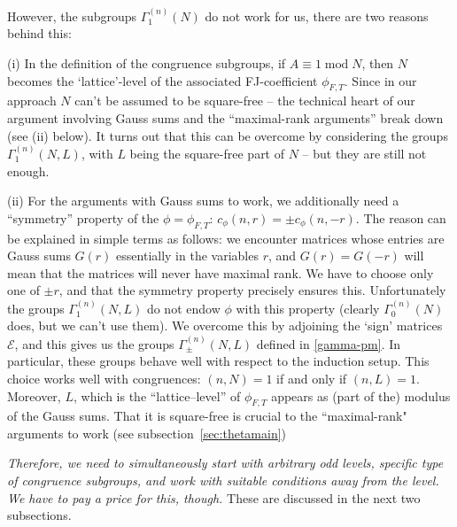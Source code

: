 \documentclass[11pt]{amsart}
\numberwithin{equation}{section}
\newcommand{\mc}{\mathcal}
\renewcommand*{\mod}{\operatorname{mod}}
\begin{document}
However, the subgroups $\Gamma_1^{(n)}(N)$ do not work for us, there are two reasons behind this:

(i) In the definition of the congruence subgroups, if $A \equiv 1 \mod N$, then $N$ becomes the `lattice'-level of  the associated FJ-coefficient $\phi_{F,T}$. Since in our approach $N$ can't be assumed to be square-free -- the technical heart of our argument involving Gauss sums  and the ``maximal-rank arguments'' break down (see (ii) below). It turns out that this can be overcome by considering the groups $\Gamma_1^{(n)}(N,L)$, with $L$ being the square-free part of $N$ -- but they are still not enough.

(ii) For the arguments with Gauss sums to work, we additionally need a ``symmetry'' property of the $\phi=\phi_{F,T}$: $c_\phi(n,r)= \pm c_\phi(n,-r)$.
The reason can be explained in simple terms as follows: we encounter matrices whose entries are Gauss sums $G(r)$ essentially in the variables $r$, and $G(r)=G(-r)$ will mean that the matrices will never have maximal rank. We have to choose only one of $\pm r$, and that the symmetry property precisely ensures this. Unfortunately the groups $\Gamma_1^{(n)}(N,L)$ do not endow $\phi$ with this property (clearly $\Gamma_0^{(n)}(N)$ does, but we can't use them). We overcome this by adjoining the `sign' matrices $\mc E$, and
this gives us the groups $\Gamma_\pm^{(n)}(N,L)$ defined in \eqref{gamma-pm}. In particular, these groups behave well with respect to the induction setup. This choice works well with congruences: $(n,N)=1$ if and only if $(n,L)=1$. Moreover, $L$, which is the ``lattice--level'' of $\phi_{F,T}$  appears as (part of the) modulus of the Gauss sums. That it is square-free is crucial to the ``maximal-rank" arguments to work (see subsection~\ref{sec:thetamain})

{\it Therefore, we need to simultaneously start with \textit{arbitrary} odd levels, specific type of congruence subgroups, and work with suitable conditions away from the level.  We have to pay a price for this, though.} These are discussed in the next two subsections.
\end{document}
